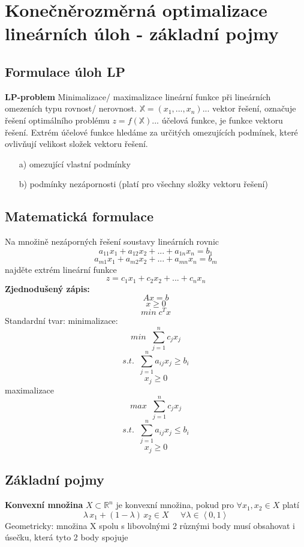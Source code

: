 \documentclass[a4]{report}
\theoremstyle{definition}
\begin{document}
\section{Konečněrozměrná optimalizace lineárních úloh - základní pojmy}

\subsection{Formulace úloh LP}
\textbf{LP-problem}
Minimalizace/ maximalizace lineární funkce při lineárních omezeních typu rovnost/ nerovnost.
\newline $\mathbb{X}=(x_{1},...,x_{n})$... vektor řešení, označuje řešení optimálního problému
\newline $z=f(\mathbb{X})$... účelová funkce, je funkce vektoru řešení. Extrém účelové funkce hledáme za určitých omezujících podmínek, které ovlivňují velikost složek vektoru řešení.
\begin{enumerate}
\item[a)] omezující vlastní podmínky
\item[b)] podmínky nezápornosti (platí pro všechny složky vektoru řešení)
\end{enumerate}

\subsection{Matematická formulace}
Na množině nezáporných řešení soustavy lineárních rovnic 
$$ a_{11}x_{1}+a_{12}x_{2}+...+a_{1n}x_{n}=b_{1}$$
$$a_{m1}x_{1}+a_{m2}x_{2}+...+a_{mn}x_{n}=b_{m}$$
najděte extrém lineární funkce
$$z=c_{1}x_{1}+c_{2}x_{2}+...+c_{n}x_{n}$$
\textbf{Zjednodušený zápis:}
$$Ax=b$$
$$x\geq 0$$
$$min\; c^{T}x$$
Standardní tvar:
minimalizace:
$$min\; \; \sum_{j=1}^{n}c_{j}x_{j}$$
$$ s.t. \; \; \sum_{j=1}^{n}a_{ij}x_{j}\geq b_{i}$$
$$ x_{j}\geq 0 $$
maximalizace
$$max\; \; \sum_{j=1}^{n}c_{j}x_{j}$$
$$ s.t. \; \; \sum_{j=1}^{n}a_{ij}x_{j}\leq b_{i}$$
$$ x_{j}\geq 0 $$

\subsection{Základní pojmy}

\textbf{Konvexní množina}
$X\subset \mathbb{R}^{n}$ je konvexní množina, pokud pro $\forall x_{1},x_{2}\in X$ platí
$$\lambda \, x_{1}+(1-\lambda )\, x_{2}\in X\; \; \; \; \; \forall \lambda \in \left \langle 0,1 \right \rangle$$
Geometricky: množina X spolu s libovolnými 2 různými body musí obsahovat i úsečku, která tyto 2 body spojuje
\end{document}
